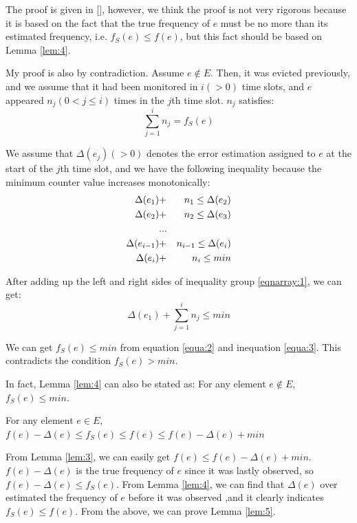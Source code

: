 \documentclass[conference]{IEEEtran}
\begin{document}
\begin{IEEEproof}
The proof is given in [], however, we think the proof is not very rigorous because it is based on the fact that the true frequency of $e$ must be no more than its estimated frequency, i.e. $f_S(e)\leq f(e)$, but this fact should be based on Lemma \ref{lem:4}.\par
My proof is also by contradiction. Assume $e\notin E$. Then, it was evicted previously, and we assume that it had been monitored in $i(>0)$ time slots, and $e$ appeared $n_j(0<j\leq i)$ times in the $j$th time slot. $n_j$ satisfies:
\begin{equation}\label{equa:2}
\sum_{j=1}^{i}n_j=f_S(e)
\end{equation}\par
We assume that $\Delta(e_j)(>0)$ denotes the error estimation assigned to $e$ at the start of the $j$th time slot, and we have the following inequality because the minimum counter value increases monotonically:
\setlength{\arraycolsep}{0.0em}
\begin{eqnarray}\label{eqnarray:1}
\Delta(e_1)&+&n_1\leq\Delta(e_2)\notag\\
\Delta(e_2)&+&n_2\leq\Delta(e_3)\notag\\
&...&\\
\Delta(e_{i-1})&+&n_{i-1}\leq\Delta(e_i)\notag\\
\Delta(e_i)&+&n_i\leq min \notag
\end{eqnarray}\par
\setlength{\arraycolsep}{5pt}
After adding up the left and right sides of inequality group \ref{eqnarray:1}, we can get:
\begin{equation}\label{equa:3}
\Delta(e_1)+\sum_{j=1}^{i}n_j\leq min
\end{equation}\par
We can get $f_S(e)\leq min$ from equation \ref{equa:2} and inequation \ref{equa:3}. This contradicts the condition $f_S(e)>min$.\par
In fact, Lemma \ref{lem:4} can also be stated as: For any element $e\notin E$, $f_S(e)\leq min$. 
\end{IEEEproof}

\begin{lemma}\label{lem:5}
  For any element $e\in E$, $f(e)-\Delta(e)\leq f_S(e)\leq f(e)\leq f(e)-\Delta(e)+min$
\end{lemma}

\begin{IEEEproof}
From Lemma \ref{lem:3}, we can easily get $f(e)\leq f(e)-\Delta(e)+min$. $f(e)-\Delta(e)$ is the true frequency of $e$ since it was lastly observed, so $f(e)-\Delta(e)\leq f_S(e)$. From Lemma \ref{lem:4}, we can find that $\Delta(e)$ over estimated the frequency of $e$ before it was observed ,and it clearly indicates $f_S(e)\leq f(e)$. From the above, we can prove Lemma \ref{lem:5}.
\end{IEEEproof}
\end{document}
